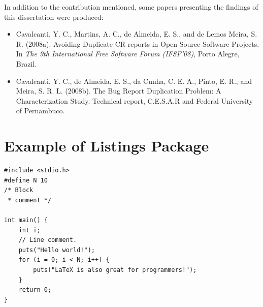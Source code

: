 In addition to the contribution mentioned, some papers presenting the
findings of this dissertation were produced:

\begin{itemize}
  \item Cavalcanti, Y. C., Martins, A. C., de Almeida, E. S., and de Lemos
  Meira, S. R. (2008a). Avoiding Duplicate CR reports in Open Source Software
  Projects. In \emph{The 9th International Free Software Forum (IFSF'08)}, Porto
  Alegre, Brazil.
  
  \item Cavalcanti, Y. C., de Almeida, E. S., da Cunha, C. E. A., Pinto, E. R.,
  and Meira, S. R. L. (2008b). The Bug Report Duplication Problem: A
  Characterization Study. Technical report, C.E.S.A.R and Federal University
  of Pernambuco.
\end{itemize}

\section{Example of Listings Package}
\lstset{language=C,basicstyle=\small}
\begin{lstlisting}[caption=This is a simple use of listings package.]
#include <stdio.h>
#define N 10
/* Block
 * comment */
 
int main() {
    int i;
    // Line comment.
    puts("Hello world!");
    for (i = 0; i < N; i++) {
        puts("LaTeX is also great for programmers!");
    }
    return 0;
}
\end{lstlisting}
